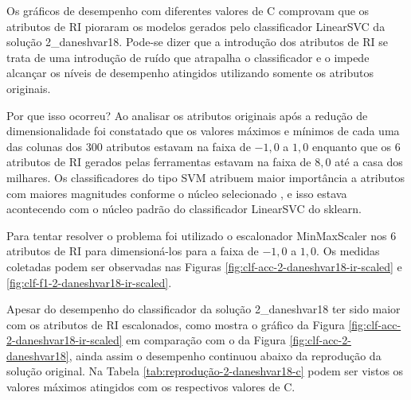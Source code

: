 			

			

			Os gráficos de desempenho com diferentes valores de C comprovam que os atributos de RI pioraram os modelos gerados pelo classificador LinearSVC da solução 2\_daneshvar18.
			Pode-se dizer que a introdução dos atributos de RI se trata de uma introdução de ruído que atrapalha o classificador e o impede alcançar os níveis de desempenho atingidos utilizando somente os atributos originais.

			Por que isso ocorreu?
			Ao analisar os atributos originais após a redução de dimensionalidade foi constatado que os valores máximos e mínimos de cada uma das colunas dos 300 atributos estavam na faixa de $-1,0$ a $1,0$ enquanto que os 6 atributos de RI gerados pelas ferramentas estavam na faixa de $8,0$ até a casa dos milhares.
			Os classificadores do tipo SVM atribuem maior importância a atributos com maiores magnitudes conforme o núcleo selecionado \cite{Kumar2014}, e isso estava acontecendo com o núcleo padrão do classificador LinearSVC do sklearn.

			Para tentar resolver o problema foi utilizado o escalonador MinMaxScaler nos 6 atributos de RI para dimensioná-los para a faixa de $-1,0$ a $1,0$. 
			Os medidas coletadas podem ser observadas nas Figuras \ref{fig:clf-acc-2-daneshvar18-ir-scaled} e \ref{fig:clf-f1-2-daneshvar18-ir-scaled}. 

			

			

			Apesar do desempenho do classificador da solução 2\_daneshvar18 ter sido maior com os atributos de RI escalonados, como mostra o gráfico da Figura \ref{fig:clf-acc-2-daneshvar18-ir-scaled} em comparação com o da Figura \ref{fig:clf-acc-2-daneshvar18}, ainda assim o desempenho continuou abaixo da reprodução da solução original.
			Na Tabela \ref{tab:reprodução-2-daneshvar18-c} podem ser vistos os valores máximos atingidos com os respectivos valores de C.

			




